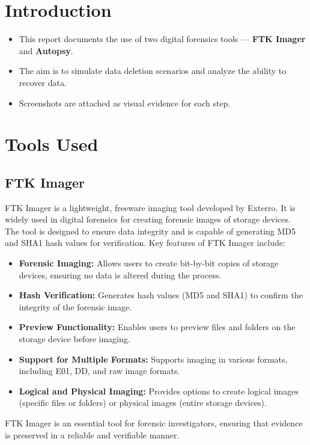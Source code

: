 \documentclass[11pt]{article}
\begin{document}
\tableofcontents
\thispagestyle{empty}
\clearpage

\setcounter{page}{1}

\section{Introduction}
\begin{itemize}
    \item This report documents the use of two digital forensics tools --- \textbf{FTK Imager} and \textbf{Autopsy}.
    \item The aim is to simulate data deletion scenarios and analyze the ability to recover data.
    \item Screenshots are attached as visual evidence for each step.
\end{itemize}

\section{Tools Used}

\subsection{FTK Imager}
FTK Imager is a lightweight, freeware imaging tool developed by Exterro. It is widely used in digital forensics for creating forensic images of storage devices. The tool is designed to ensure data integrity and is capable of generating MD5 and SHA1 hash values for verification. Key features of FTK Imager include:
\begin{itemize}
    \item \textbf{Forensic Imaging:} Allows users to create bit-by-bit copies of storage devices, ensuring no data is altered during the process.
    \item \textbf{Hash Verification:} Generates hash values (MD5 and SHA1) to confirm the integrity of the forensic image.
    \item \textbf{Preview Functionality:} Enables users to preview files and folders on the storage device before imaging.
    \item \textbf{Support for Multiple Formats:} Supports imaging in various formats, including E01, DD, and raw image formats.
    \item \textbf{Logical and Physical Imaging:} Provides options to create logical images (specific files or folders) or physical images (entire storage devices).
\end{itemize}
FTK Imager is an essential tool for forensic investigators, ensuring that evidence is preserved in a reliable and verifiable manner.
\end{document}

